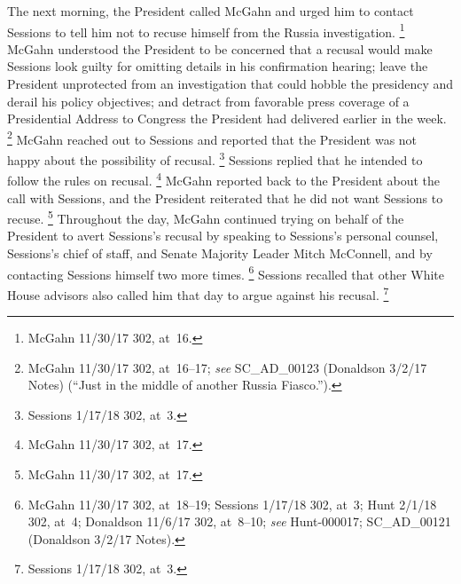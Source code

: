 The next morning, the President called McGahn and urged him to contact Sessions to tell him not to recuse himself from the Russia investigation.%
\footnote{McGahn 11/30/17 302, at~16.}
McGahn understood the President to be concerned that a recusal would make Sessions look guilty for omitting details in his confirmation hearing;
leave the President unprotected from an investigation that could hobble the presidency and derail his policy objectives;
and detract from favorable press coverage of a Presidential Address to Congress the President had delivered earlier in the week.%
\footnote{McGahn 11/30/17 302, at~16--17;
\textit{see} SC\_AD\_00123 (Donaldson 3/2/17 Notes) (``Just in the middle of another Russia Fiasco.'').}
McGahn reached out to Sessions and reported that the President was not happy about the possibility of recusal.%
\footnote{Sessions 1/17/18 302, at~3.}
Sessions replied that he intended to follow the rules on recusal.%
\footnote{McGahn 11/30/17 302, at~17.}
McGahn reported back to the President about the call with Sessions, and the President reiterated that he did not want Sessions to recuse.%
\footnote{McGahn 11/30/17 302, at~17.}
Throughout the day, McGahn continued trying on behalf of the President to avert Sessions's recusal by speaking to Sessions's personal counsel, Sessions's chief of staff, and Senate Majority Leader Mitch McConnell, and by contacting Sessions himself two more times.%
\footnote{McGahn 11/30/17 302, at~18--19;
Sessions 1/17/18 302, at~3;
Hunt 2/1/18 302, at~4;
Donaldson 11/6/17 302, at~8--10;
\textit{see} Hunt-000017;
SC\_AD\_00121 (Donaldson 3/2/17 Notes).}
Sessions recalled that other White House advisors also called him that day to argue against his recusal.%
\footnote{Sessions 1/17/18 302, at~3.}

